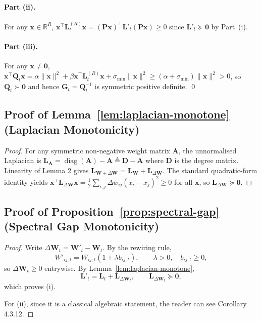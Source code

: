 \documentclass{article}
\theoremstyle{plain}
\theoremstyle{definition}
\theoremstyle{remark}
\newcommand{\R}{\mathbb{R}}
\newcommand{\diag}{\operatorname{diag}}
\begin{document}
\paragraph{Part (ii).}
For any $\mathbf{x} \in \R^R$,
$\mathbf{x}^\top \mathbf{L}_t^{(R)} \mathbf{x}
= (\mathbf{Px})^\top \mathbf{L}'_t (\mathbf{Px}) \ge 0$
since $\mathbf{L}'_t \succeq \mathbf{0}$ by Part~(i).

\paragraph{Part (iii).}
For any $\mathbf{x} \ne \mathbf{0}$,
$\mathbf{x}^\top \mathbf{Q}_t \mathbf{x}
= \alpha\|\mathbf{x}\|^2 + \beta\mathbf{x}^\top \mathbf{L}_t^{(R)}\mathbf{x}
+ \sigma_{\min}\|\mathbf{x}\|^2
\ge (\alpha+\sigma_{\min})\|\mathbf{x}\|^2 > 0$,
so $\mathbf{Q}_t \succ \mathbf{0}$ and hence $\mathbf{G}_t = \mathbf{Q}_t^{-1}$
is symmetric positive definite. \qed

\subsection{Proof of Lemma~\ref{lem:laplacian-monotone} (Laplacian Monotonicity)}

\begin{proof}
For any symmetric non-negative weight matrix $\mathbf{A}$, the unnormalised
Laplacian is $\mathbf{L}_{\mathbf{A}} = \diag(\mathbf{A}) -
\mathbf{A} \triangleq \mathbf{D}-\mathbf{A}$ where $\mathbf{D}$ is the degree matrix. Linearity of Lemma 2 gives
$\mathbf{L}_{\mathbf{W}+\Delta\mathbf{W}} = \mathbf{L}_{\mathbf{W}}
+ \mathbf{L}_{\Delta\mathbf{W}}$.  The standard quadratic-form identity
yields $\mathbf{x}^\top \mathbf{L}_{\Delta\mathbf{W}} \mathbf{x}
= \frac{1}{2}\sum_{i,j}\Delta w_{ij}(x_i-x_j)^2 \ge 0$ for all
$\mathbf{x}$, so $\mathbf{L}_{\Delta\mathbf{W}} \succeq \mathbf{0}$.
\end{proof}

\subsection{Proof of Proposition~\ref{prop:spectral-gap} (Spectral Gap Monotonicity)}

\begin{proof}
Write $\Delta\mathbf{W}_t = \mathbf{W}'_t - \mathbf{W}_t$. By the rewiring
rule,
\[
W'_{ij,t} = W_{ij,t}(1 + \lambda b_{ij,t}),
\qquad
\lambda > 0,\quad b_{ij,t}\ge 0,
\]
so $\Delta\mathbf{W}_t \ge 0$ entrywise. By
Lemma~\ref{lem:laplacian-monotone},
\[
\mathbf{L}'_t = \mathbf{L}_t + \mathbf{L}_{\Delta\mathbf{W}_t},
\qquad
\mathbf{L}_{\Delta\mathbf{W}_t}\succeq \mathbf{0},
\]
which proves (i).

For (ii), since it is a classical algebraic statement, the reader can see Corollary 4.3.12\cite{Horn_Johnson_1985}.

\end{proof}
\end{document}
